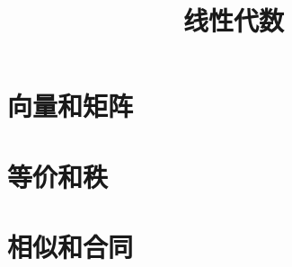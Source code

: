 \documentclass[aspectratio=169,handout]{ctexbeamer}
\title{线性代数}
\begin{document}


\part{向量和矩阵}







\part{等价和秩}





\part{相似和合同}



\end{document}
